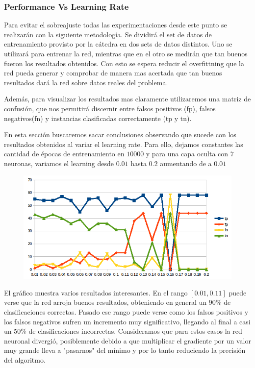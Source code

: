 \subsubsection{Performance Vs Learning Rate} 

Para evitar el sobreajuste todas las experimentaciones desde este punto se realizarán con la siguiente metodología. Se dividirá el set de datos de entrenamiento provisto por la cátedra en dos sets de datos distintos. Uno se utilizará para entrenar la red, mientras que en el otro se medirán que tan buenos fueron los resultados obtenidos. Con esto se espera reducir el overfittning que la red pueda generar y comprobar de manera mas acertada que tan buenos resultados dará la red sobre datos reales del problema.

Además, para visualizar los resultados mas claramente utilizaremos una matriz de confusión, que nos permitirá discernir entre falsos positivos (fp), falsos negativos(fn) y instancias clasificadas correctamente (tp y tn).

En esta sección buscaremos sacar conclusiones observando que sucede con los resultados obtenidos al variar el learning rate. Para ello, dejamos constantes las cantidad de épocas de entrenamiento en $10000$ y para una capa oculta con $7$ neuronas, variamos el learning desde $0.01$ hasta $0.2$ aumentando de a $0.01$

\begin{figure}[h!]
\centering
\includegraphics[scale=0.4]{ej1/test_learning_rate.png}
\end{figure}

El gráfico muestra varios resultados interesantes. En el rango $[0.01,0.11]$ puede verse que la red arroja buenos resultados, obteniendo en general un $90\%$ de clasificaciones correctas. Pasado ese rango puede verse como los falsos positivos y los falsos negativos sufren un incremento muy significativo, llegando al final a casi un $50\%$ de clasificaciones incorrectas. Consideramos que para estos casos la red neuronal divergió, posiblemente debido a que multiplicar el gradiente por un valor muy grande lleva a "pasarnos" del mínimo y por lo tanto reduciendo la precisión del algoritmo.

